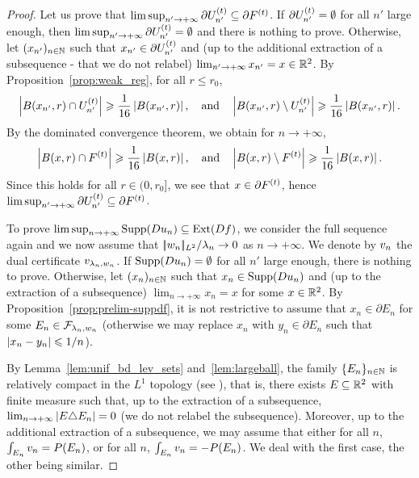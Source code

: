 \begin{proof}
Let us prove that $\limsup_{n'\to+\infty} \partial U_{n'}^{(t)}\subseteq \partial F^{(t)}$. If $\partial U_{n'}^{(t)}=\emptyset$ for all $n'$ large enough, then $\limsup_{n'\to+\infty} \partial U_{n'}^{(t)}=\emptyset$ and there is nothing to prove. Otherwise, let $(x_{n'})_{n\in\mathbb{N}}$ such that $x_{n'}\in  \partial U_{n'}^{(t)}$ and (up to the additional extraction of a subsequence - that we do not relabel) $\lim_{n'\to+\infty}x_{n'}=x\in \mathbb{R}^2$. By Proposition~\ref{prop:weak_reg}, for all $r \leq r_0$,
\begin{equation*}
  \left| B(x_{n'},r)\cap U_{n'}^{(t)} \right|\geqslant \frac{1}{16}\left| B(x_{n'},r) \right|,\quad \text{and} \quad \left| B(x_{n'},r)\setminus U_{n'}^{(t)} \right| \geqslant \frac{1}{16}\left| B(x_{n'},r) \right|.
\end{equation*}
By the dominated convergence theorem, we obtain for $n\to+\infty$,
\begin{equation*}
  \left| B(x,r)\cap F^{(t)} \right|\geqslant \frac{1}{16}\left| B(x,r) \right|,\quad \text{and} \quad \left| B(x,r)\setminus F^{(t)} \right| \geqslant \frac{1}{16}\left| B(x,r) \right|.
\end{equation*}
Since this holds for all $r\in (0,r_0]$, we see that $x\in \partial F^{(t)}$, hence $\limsup_{n'\to+\infty} \partial U_{n'}^{(t)}\subseteq \partial F^{(t)}$.



To prove $\limsup_{n\to+\infty} \operatorname{Supp}(Du_{n})\subseteq \operatorname{Ext}(Df)$, we consider the full sequence again and we now assume that ${|\!| w_n |\!|_{L^2}}/{\lambda_n}\to 0$ as $n\to +\infty$. We denote by $v_{n}$ the dual certificate $v_{\lambda_n,w_n}$. If $\operatorname{Supp}(Du_{n})=\emptyset$ for all $n'$ large enough, there is nothing to prove. Otherwise, let $(x_n)_{n\in\mathbb{N}}$ such that $x_n\in\operatorname{Supp}(Du_{n})$ and (up to the extraction of a subsequence) $\lim_{n\to+\infty}x_n=x$ for some $x\in \mathbb{R}^2$. By Proposition~\ref{prop:prelim-suppdf}, it is not restrictive to assume that $x_n\in \partial E_n$ for some $E_n\in \mathcal{F}_{\lambda_n,w_n}$ (otherwise we may replace $x_n$ with $y_n\in \partial E_n$ such that $\left| x_n-y_n \right|\leqslant 1/n$).

  By Lemma~\ref{lem:unif_bd_lev_sets} and~\ref{lem:largeball}, the family $\{E_n\}_{n\in\mathbb{N}}$ is relatively compact in the $L^1$ topology (see \cite[Thm. 12.26]{maggi2012sets}), that is, there exists $E\subseteq \mathbb{R}^2$ with finite measure such that, up to the extraction of a subsequence, $\lim_{n\to +\infty} \left| E\triangle E_n \right|=0$ (we do not relabel the subsequence). Moreover, up to the additional extraction of a subsequence, we may assume that either for all $n$, $\int_{E_n}v_{n} =P(E_n)$, or for all $n$,
$\int_{E_n}v_{n} =-P(E_n)$. We deal with the first case, the other being similar.


\end{proof}

